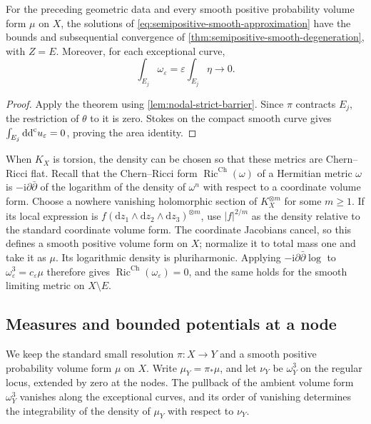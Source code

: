 \begin{corollary}\label{cor:nodal-potential-degeneration}
For the preceding geometric data and every smooth positive probability volume form $\mu$ on $X$, the solutions of \eqref{eq:semipositive-smooth-approximation} have the bounds and subsequential convergence of \cref{thm:semipositive-smooth-degeneration}, with $Z=E$. Moreover, for each exceptional curve,
\[
 \int_{E_j}\omega_\varepsilon
       =\varepsilon\int_{E_j}\eta\longrightarrow0.
\]
\end{corollary}
\begin{proof}
Apply the theorem using \cref{lem:nodal-strict-barrier}. Since $\pi$ contracts $E_j$, the restriction of $\theta$ to it is zero. Stokes on the compact smooth curve gives $\int_{E_j}\mathrm{dd}^{\mathrm{c}} u_\varepsilon=0$, proving the area identity.
\end{proof}

When $K_X$ is torsion, the density can be chosen so that these metrics are Chern--Ricci flat. Recall that the Chern--Ricci form $\operatorname{Ric}^{\mathrm{Ch}}(\omega)$ of a Hermitian metric $\omega$ is $-\mathrm{i}\partial\bar\partial$ of the logarithm of the density of $\omega^n$ with respect to a coordinate volume form. Choose a nowhere vanishing holomorphic section of $K_X^{\otimes m}$ for some $m\geq1$. If its local expression is $f(\mathrm{d}z_1\wedge\mathrm{d}z_2\wedge\mathrm{d}z_3)^{\otimes m}$, use $|f|^{2/m}$ as the density relative to the standard coordinate volume form. The coordinate Jacobians cancel, so this defines a smooth positive volume form on $X$; normalize it to total mass one and take it as $\mu$. Its logarithmic density is pluriharmonic. Applying $-\mathrm{i}\partial\bar\partial\log$ to $\omega_\varepsilon^3=c_\varepsilon\mu$ therefore gives $\operatorname{Ric}^{\mathrm{Ch}}(\omega_\varepsilon)=0$, and the same holds for the smooth limiting metric on $X\setminus E$.

\subsection{Measures and bounded potentials at a node}
\label{subsec:nodal-measures-potentials}

We keep the standard small resolution $\pi\colon X\to Y$ and a smooth positive probability volume form $\mu$ on $X$. Write $\mu_Y=\pi_*\mu$, and let $\nu_Y$ be $\omega_Y^3$ on the regular locus, extended by zero at the nodes. The pullback of the ambient volume form $\omega_Y^3$ vanishes along the exceptional curves, and its order of vanishing determines the integrability of the density of $\mu_Y$ with respect to $\nu_Y$.

